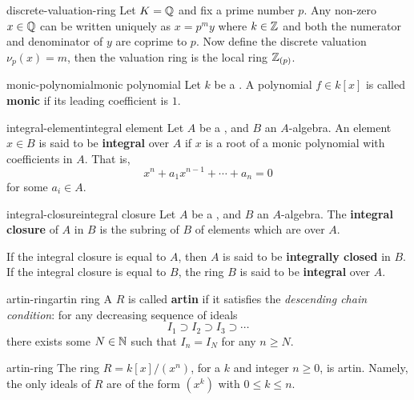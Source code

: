 \begin{example}{discrete-valuation-ring}
    Let $K = \mathbb{Q}$ and fix a prime number $p$. Any non-zero $x \in \mathbb{Q}$ can be written uniquely as $x = p^m y$ where $k \in \mathbb{Z}$ and both the numerator and denominator of $y$ are coprime to $p$. Now define the discrete valuation $\nu_p(x) = m$, then the valuation ring is the local ring $\mathbb{Z}_{(p)}$.
\end{example}

\begin{topic}{monic-polynomial}{monic polynomial}
    Let $k$ be a . A polynomial $f \in k[x]$ is called \textbf{monic} if its leading coefficient is $1$.
\end{topic}

\begin{topic}{integral-element}{integral element}
    Let $A$ be a , and $B$ an $A$-algebra. An element $x \in B$ is said to be \textbf{integral} over $A$ if $x$ is a root of a monic polynomial with coefficients in $A$. That is,
    \[ x^n + a_1 x^{n - 1} + \cdots + a_n = 0 \]
    for some $a_i \in A$.
\end{topic}

\begin{topic}{integral-closure}{integral closure}
    Let $A$ be a , and $B$ an $A$-algebra. The \textbf{integral closure} of $A$ in $B$ is the subring of $B$ of elements which are  over $A$.
    
    If the integral closure is equal to $A$, then $A$ is said to be \textbf{integrally closed} in $B$. If the integral closure is equal to $B$, the ring $B$ is said to be \textbf{integral} over $A$.
\end{topic}

\begin{topic}{artin-ring}{artin ring}
    A  $R$ is called \textbf{artin} if it satisfies the \textit{descending chain condition}: for any decreasing sequence of ideals
    \[ I_1 \supset I_2 \supset I_3 \supset \cdots \]
    there exists some $N \in \mathbb{N}$ such that $I_n = I_N$ for any $n \ge N$.
\end{topic}

\begin{example}{artin-ring}
    The ring $R = k[x] / (x^n)$, for a  $k$ and integer $n \ge 0$, is artin. Namely, the only ideals of $R$ are of the form $(x^k)$ with $0 \le k \le n$. 
\end{example}

